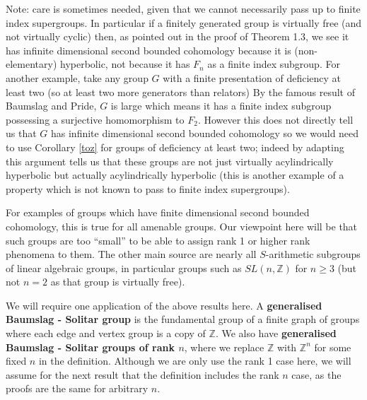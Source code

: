 \documentclass[11pt,reqno]{amsart}
\numberwithin{equation}{section}
\newcommand{\Z}{\mathbb{Z}}
\theoremstyle{definition}
\theoremstyle{remark}
\begin{document}
Note: care is sometimes needed, given that we
cannot necessarily pass up to finite
index supergroups. In particular if a finitely generated group 
is virtually free (and not virtually cyclic)
then, as pointed out in the proof of \cite{kj2} Theorem
1.3, we see it has infinite dimensional second bounded cohomology because
it is (non-elementary) hyperbolic, not because it has $F_n$ as a finite
index subgroup. For another example, take any group $G$
with a finite presentation
of deficiency at least two (so at least two more generators than
relators) By the famous result
\cite{bp} of Baumslag and Pride, $G$ is large which means it has a finite
index subgroup possessing a surjective homomorphism to $F_2$. However
this does not directly tell us that $G$ has infinite dimensional second
bounded cohomology so we would need to use
Corollary \ref{toz} for groups of deficiency at least two;
indeed by adapting this argument
\cite{mofup} tells us that these groups are 
not just virtually acylindrically hyperbolic but actually acylindrically
hyperbolic (this is another example of a property which is not known
to pass to finite index supergroups).

For examples of groups which have finite dimensional second bounded cohomology,
this is true for all amenable groups. Our viewpoint here will be that such
groups are too ``small'' to be able to assign rank 1 or higher rank
phenomena to them. The other main source are nearly all
$S$-arithmetic subgroups of linear algebraic groups, in particular
groups such as $SL(n,\Z)$ for $n\geq 3$ (but not $n=2$ as that group is
virtually free).


We will require one application of the above results here. A {\bf generalised
Baumslag - Solitar group} is the fundamental group of a finite graph
of groups where each edge and vertex group is a copy of $\Z$. We also
have {\bf generalised Baumslag - Solitar groups of rank $n$}, where we
  replace $\Z$ with $\Z^n$ for some fixed $n$ in the definition. Although
  we are only use the rank 1 case here, we will assume for the next result
  that the definition includes the rank $n$ case, as the proofs are the same
  for arbitrary $n$.
\end{document}
